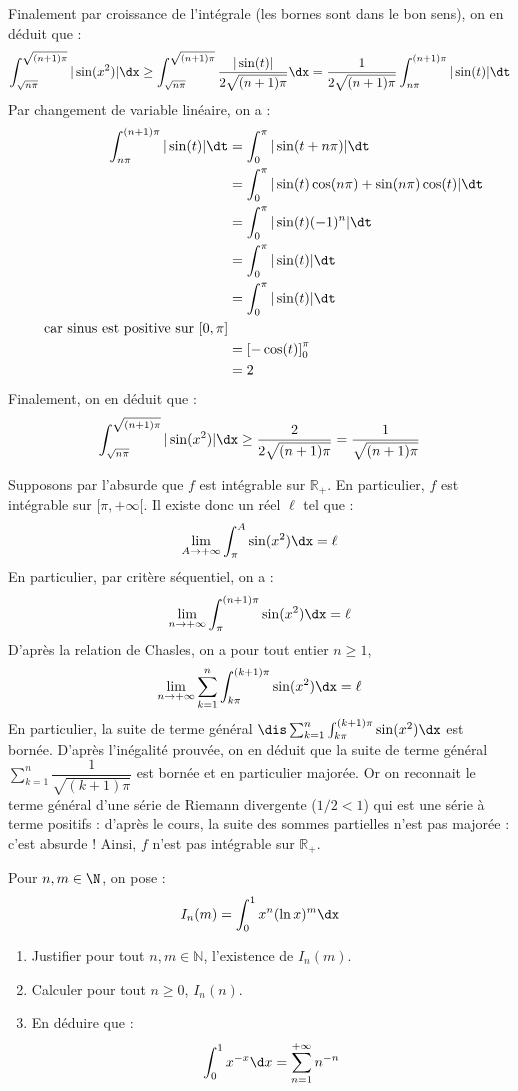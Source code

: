 \documentclass[a4paper,10pt]{report}
\begin{document}
\begin{enumerate}
Finalement par croissance de l'intégrale (les bornes sont dans le bon sens), on en déduit que :
$$ \int_{\sqrt{n \pi}}^{\sqrt{(n+1)\pi}} \vert \sin(x^2) \vert \dx \geq \int_{\sqrt{n \pi}}^{\sqrt{(n+1)\pi}} \dfrac{\vert \sin(t) \vert}{2 \sqrt{(n+1)\pi}} \dx = \dfrac{1}{2 \sqrt{(n+1)\pi}} \int_{n\pi}^{(n+1) \pi} \vert \sin(t) \vert \dt$$
Par changement de variable linéaire, on a : 
\begin{align*}
 \int_{n\pi}^{(n+1) \pi} \vert \sin(t) \vert \dt & =  \int_{0}^{\pi} \vert \sin(t+n \pi) \vert \dt\\
 & = \int_{0}^{\pi} \vert \sin(t) \cos(n \pi)+ \sin(n\pi)\cos(t) \vert \dt \\
 & =  \int_{0}^{\pi} \vert \sin(t) (-1)^n  \vert \dt \\
 & = \int_{0}^{\pi} \vert \sin(t)  \vert \dt \\
 & = \int_{0}^{\pi} \vert \sin(t)  \vert \dt \\ \; \hbox{ car sinus est positive sur } [0,\pi] \\
 & = \left[- \cos(t) \right]_0^{\pi} \\
 & = 2
\end{align*}
Finalement, on en déduit que :
$$ \int_{\sqrt{n \pi}}^{\sqrt{(n+1)\pi}} \vert \sin(x^2) \vert \dx \geq \dfrac{2}{2 \sqrt{(n+1)\pi}} = \dfrac{1}{\sqrt{(n+1)\pi}}$$
 \end{enumerate}
Supposons par l'absurde que $f$ est intégrable sur $\mathbb{R}_+$. En particulier, $f$ est intégrable sur $[\pi, + \infty[$. Il existe donc un réel $\ell$ tel que :
 $$ \lim_{A \rightarrow + \infty} \int_{\pi}^A \sin(x^2) \dx = \ell$$
 En particulier, par critère séquentiel, on a :
 $$ \lim_{n \rightarrow + \infty} \int_{\pi}^{(n+1)\pi} \sin(x^2) \dx = \ell$$
 D'après la relation de Chasles, on a pour tout entier $n \geq 1$,
 $$ \lim_{n \rightarrow + \infty} \sum_{k=1}^n \int_{k\pi}^{(k+1)\pi} \sin(x^2) \dx = \ell$$
 En particulier, la suite de terme général $\dis \sum_{k=1}^n \int_{k\pi}^{(k+1)\pi} \sin(x^2) \dx$ est bornée. D'après l'inégalité prouvée, on en déduit que la suite de terme général $\sum_{k=1}^n \dfrac{1}{\sqrt{(k+1)\pi}}$ est bornée et en particulier majorée. Or on reconnait le terme général d'une série de Riemann divergente ($1/2<1$) qui est une série à terme positifs : d'après le cours, la suite des sommes partielles n'est pas majorée : c'est absurde ! Ainsi, $f$ n'est pas intégrable sur $\mathbb{R}_+$.
 
 
\begin{Exercice}{} Pour $n,m \in \N$, on pose :
  \[
  I_{n}(m) = \int_{0}^{1} x^{n}(\ln x)^{m} \dx
  \]
  \begin{enumerate}
  \item Justifier pour tout $n,m \in \mathbb{N}$, l'existence de $I_n(m)$.
  \item Calculer pour tout $n \geq 0$, $I_{n}(n)$.
  \item
    En déduire que :
    \[
    \int_{0}^{1} x^{ - x} \d x = \sum_{n = 1}^{ + \infty} n^{ - n}
    \]
  \end{enumerate}
\end{Exercice}
\end{document}
